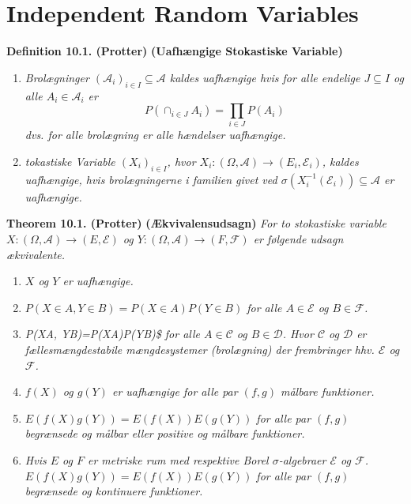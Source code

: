 \documentclass[
]{book}
\providecommand{\tightlist}{%
  \setlength{\itemsep}{0pt}\setlength{\parskip}{0pt}}
\begin{document}
\hypertarget{independent-random-variables}{%
\section{Independent Random Variables}\label{independent-random-variables}}

\textbf{Definition 10.1. (Protter)} \textbf{(Uafhængige Stokastiske Variable)}

\begin{enumerate}
\def\labelenumi{\alph{enumi}.}
\tightlist
\item
  \emph{Brolægninger \((\mathcal{A}_i)_{i\in I}\subseteq \mathcal{A}\) kaldes uafhængige hvis for alle endelige \(J\subseteq I\) og alle \(A_i\in\mathcal{A}_i\) er}
  \[
    P(\cap_{i\in J} A_i)=\prod_{i\in J}P(A_i)
    \]
  \emph{dvs. for alle brolægning er alle hændelser uafhængige.}
\item
  \emph{tokastiske Variable \((X_i)_{i\in I}\), hvor \(X_i : (\Omega, \mathcal{A})\to (E_i,\mathcal{E}_i)\), kaldes uafhængige, hvis brolægningerne i familien givet ved \(\sigma(X_i^{-1}(\mathcal{E}_i))\subseteq \mathcal{A}\) er uafhængige.}
\end{enumerate}

\textbf{Theorem 10.1. (Protter)} \textbf{(Ækvivalensudsagn)} \emph{For to stokastiske variable \(X : (\Omega, \mathcal{A})\to (E,\mathcal{E})\) og \(Y : (\Omega, \mathcal{A})\to (F,\mathcal{F})\) er følgende udsagn ækvivalente.}

\begin{enumerate}
\def\labelenumi{\alph{enumi}.}
\setcounter{enumi}{14}
\tightlist
\item
  \emph{\(X\) og \(Y\) er uafhængige.}
\item
  \emph{\(P(X\in A, Y\in B)=P(X\in A)P(Y\in B)\) for alle \(A\in \mathcal{E}\) og \(B\in\mathcal{F}\).}
\item
  \emph{P(X\in A, Y\in B)=P(X\in A)P(Y\in B)\$ for alle \(A\in \mathcal{C}\) og \(B\in\mathcal{D}\). Hvor \(\mathcal{C}\) og \(\mathcal{D}\) er fællesmængdestabile mængdesystemer (brolægning) der frembringer hhv. \(\mathcal{E}\) og \(\mathcal{F}\).}
\item
  \emph{\(f(X)\) og \(g(Y)\) er uafhængige for alle par \((f,g)\) målbare funktioner.}
\item
  \emph{\(E(f(X)g(Y))=E(f(X))E(g(Y))\) for alle par \((f,g)\) begrænsede og målbar eller positive og målbare funktioner.}
\item
  \emph{Hvis \(E\) og \(F\) er metriske rum med respektive Borel \(\sigma\)-algebraer \(\mathcal{E}\) og \(\mathcal{F}\). \(E(f(X)g(Y))=E(f(X))E(g(Y))\) for alle par \((f,g)\) begrænsede og kontinuere funktioner. }
\end{enumerate}
\end{document}
